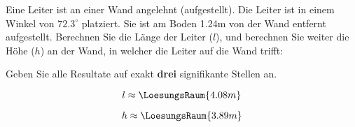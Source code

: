 
\begin{frage}[2]
  Eine Leiter ist an einer Wand angelehnt (aufgestellt).
  Die Leiter ist in einem Winkel von $72.3^{\circ}$ platziert.
  Sie ist am Boden 1.24m von der Wand entfernt aufgestellt.
  Berechnen Sie die Länge der Leiter ($l$), und berechnen Sie weiter die
  Höhe ($h$) an der Wand, in welcher die Leiter auf die Wand trifft:
\begin{center}
\end{center}

Geben Sie alle Resultate auf exakt \textbf{drei} signifikante Stellen
an.

$$l \approx \LoesungsRaum{4.08m}$$

$$h \approx \LoesungsRaum{3.89m}$$

\end{frage}
  
